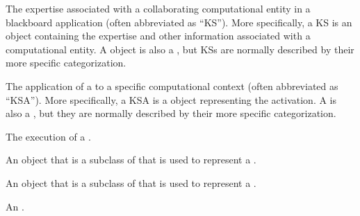 \begin{glossary-list}

%
%
%
%
%
The expertise associated with a collaborating computational entity in
a blackboard application (often abbreviated as ``KS''). More
specifically, a KS is an object containing the expertise and other
information associated with a computational entity. A  object
is also a , but KSs are normally described
by their more specific categorization.


\glent[KS~activation]
%
%
%
%
%
%
%
%
%
The application of a  to a specific computational context
(often abbreviated as ``KSA'').  More specifically, a KSA is a
 object representing the  activation.  A
 is also a , but they are normally
described by their more specific categorization.


\glent[KS~execution]
%
%
%
%
%
The execution of a .


\glent[ks~class]
%
%
%
%
%
An object that is a subclass of
 that is used to represent a
.


%
%
%
%
%
An object that is a subclass of
 that is used to represent a
.


%
%
An .


\end{glossary-list}
